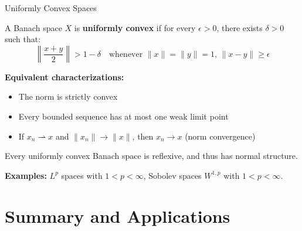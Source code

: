 \documentclass[aspectratio=169,10pt]{beamer}
\begin{document}
\begin{frame}{Uniformly Convex Spaces}
    \begin{definition}
        A Banach space $X$ is \textbf{uniformly convex} if for every $\epsilon > 0$,
        there exists $\delta > 0$ such that:
        \[
            \left\| \frac{x + y}{2} \right\| > 1 - \delta \quad \text{whenever } \|x\| = \|y\| = 1, \, \|x - y\| \geq \epsilon
        \]
    \end{definition}

    \vspace{0.3cm}

    \textbf{Equivalent characterizations:}
    \begin{itemize}
        \item The norm is strictly convex
        \item Every bounded sequence has at most one weak limit point
        \item If $x_n \rightharpoonup x$ and $\|x_n\| \to \|x\|$, then $x_n \to x$ (norm convergence)
    \end{itemize}

    \vspace{0.3cm}

    \begin{theorem}
        Every uniformly convex Banach space is reflexive, and thus has normal structure.
    \end{theorem}

    \vspace{0.3cm}

    \textbf{Examples:} $L^p$ spaces with $1 < p < \infty$, Sobolev spaces $W^{1,p}$ with $1 < p < \infty$.
\end{frame}

\section{Summary and Applications}
\end{document}
